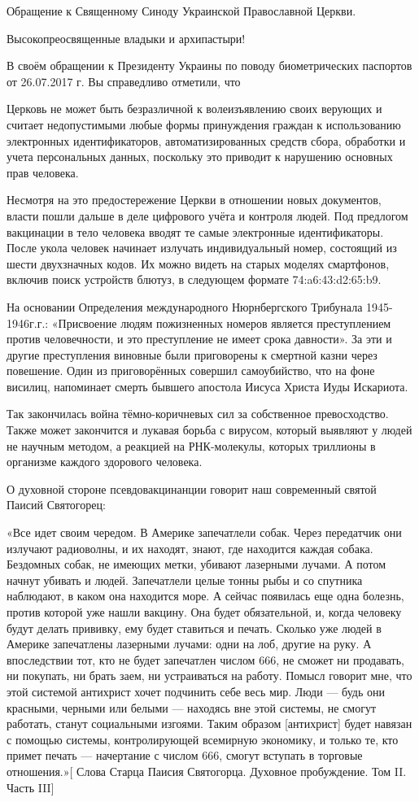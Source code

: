 \begin{itemize}
Обращение к Священному Синоду Украинской Православной Церкви.

Высокопреосвященные владыки и архипастыри!

В своём обращении к Президенту Украины по поводу биометрических паспортов от
26.07.2017 г. Вы справедливо отметили, что

Церковь не может быть безразличной к волеизъявлению своих верующих и считает
недопустимыми любые формы принуждения граждан к использованию электронных
идентификаторов, автоматизированных средств сбора, обработки и учета
персональных данных, поскольку это приводит к нарушению основных прав человека.

Несмотря на это предостережение Церкви в отношении новых документов, власти
пошли дальше в деле цифрового учёта и контроля людей. Под предлогом вакцинации
в тело человека вводят те самые электронные идентификаторы. После укола человек
начинает излучать индивидуальный номер, состоящий из шести двухзначных кодов.
Их можно видеть на старых моделях смартфонов, включив поиск устройств блютуз, в
следующем формате 74:a6:43:d2:65:b9.

На основании Определения международного Нюрнбергского Трибунала 1945-1946г.г.:
«Присвоение людям пожизненных номеров является преступлением против
человечности, и это преступление не имеет срока давности». За эти и другие
преступления виновные были приговорены к смертной казни через повешение. Один
из приговорённых совершил самоубийство, что на фоне висилиц, напоминает смерть
бывшего апостола Иисуса Христа Иуды Искариота.

Так закончилась война тёмно-коричневых сил за собственное превосходство. Также
может закончится и лукавая борьба с вирусом, который выявляют у людей не
научным методом, а реакцией на РНК-молекулы, которых триллионы в организме
каждого здорового человека.

О духовной стороне псевдовакцинанции говорит наш современный святой Паисий Святогорец:

«Все идет своим чередом. В Америке запечатлели собак. Через передатчик они
излучают радиоволны, и их находят, знают, где находится каждая собака.
Бездомных собак, не имеющих метки, убивают лазерными лучами. А потом начнут
убивать и людей. Запечатлели целые тонны рыбы и со спутника наблюдают, в каком
она находится море. А сейчас появилась еще одна болезнь, против которой уже
нашли вакцину. Она будет обязательной, и, когда человеку будут делать прививку,
ему будет ставиться и печать. Сколько уже людей в Америке запечатлены лазерными
лучами: одни на лоб, другие на руку. А впоследствии тот, кто не будет
запечатлен числом 666, не сможет ни продавать, ни покупать, ни брать заем, ни
устраиваться на работу. Помысл говорит мне, что этой системой антихрист хочет
подчинить себе весь мир. Люди — будь они красными, черными или белыми —
находясь вне этой системы, не смогут работать, станут социальными изгоями.
Таким образом [антихрист] будет навязан с помощью системы, контролирующей
всемирную экономику, и только те, кто примет печать — начертание с числом 666,
смогут вступать в торговые отношения.»[ Слова Старца Паисия Святогорца.
Духовное пробуждение. Том II. Часть III]


\end{itemize}
